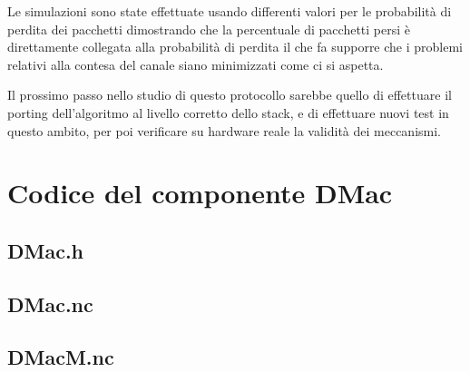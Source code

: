 \documentclass[twoside,11pt,a4paper,italian,openany]{book}
\begin{document}
Le simulazioni sono state effettuate usando differenti valori per le probabilità di perdita 
dei pacchetti dimostrando che la percentuale di pacchetti persi è direttamente collegata  
alla probabilità di perdita il che fa supporre che i problemi relativi alla contesa del 
canale siano minimizzati come ci si aspetta. 


Il prossimo passo nello studio di questo protocollo sarebbe quello di effettuare il 
porting dell'algoritmo al livello corretto dello stack, e di effettuare nuovi test in questo 
ambito, per poi verificare su hardware reale la validità dei meccanismi. 

\appendix
\lstset{
  basicstyle=\small,
  numbers=left, 
  stepnumber=5, 
  numbersep=8pt,
  frame=L,
  }
\chapter{Codice del componente DMac}
\section{DMac.h}

\section{DMac.nc}

\section{DMacM.nc}


%
%
%
%
\end{document}
